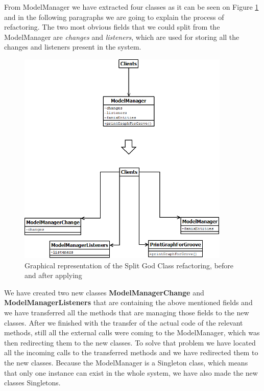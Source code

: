 \documentclass{article}
\begin{document}
From ModelManager we have extracted four classes as it can be seen on Figure \ref{fig:GodClassSplit} and in the following paragraphs we are going to explain the process of refactoring. The two most obvious fields that we could split from the ModelManager are \emph{changes} and \emph{listeners}, which are used for storing all the changes and listeners present in the system.

\begin{figure}[h]
\centering
\includegraphics[width=0.9\textwidth]{Images/GodClassSplit}
\caption{Graphical representation of the Split God Class refactoring, before and after applying}
\label{fig:GodClassSplit}
\end{figure}

We have created two new classes \textbf{ModelManagerChange} and \textbf{ModelManagerListeners} that are containing the above mentioned fields and we have transferred all the methods that are managing those fields to the new classes. After we finished with the transfer of the actual code of the relevant methods, still all the external calls were coming to the ModelManager, which was then redirecting them to the new classes. To solve that problem we have located all the incoming calls to the transferred methods and we have redirected them to the new classes. Because the ModelManager is a Singleton class, which means that only one instance can exist in the whole system, we have also made the new classes Singletons.
\end{document}
